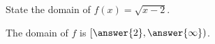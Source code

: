 \documentclass{ximera}
\author{Carl Stitz \and Jeff Zeager \and Bart Snapp \and Matthew Carr}
\begin{document}
\begin{exercise}



State the domain of $f(x)=\sqrt{x-2}$.
\begin{center}
The domain of $f$ is $[\answer{2},\answer{\infty})$.
\end{center}

\end{exercise}
\end{document}
